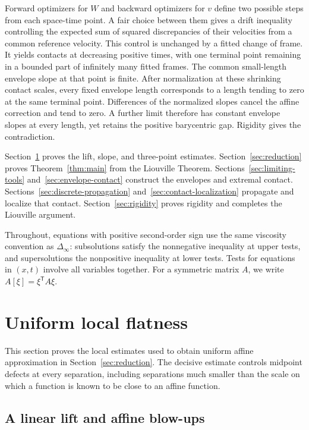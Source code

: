 \documentclass[11pt]{article}
\numberwithin{equation}{section}
\theoremstyle{definition}
\theoremstyle{remark}
\newcommand{\Dinf}{\Delta_{\infty}}
\begin{document}
Forward optimizers for $W$ and backward optimizers for $v$ define two
possible steps from each space-time point. A fair choice between them
gives a drift inequality controlling the expected sum of squared discrepancies
of their velocities from a common reference velocity. This control is
unchanged by a fitted change of frame. It yields contacts at decreasing
positive times, with one terminal point remaining in a bounded part of
infinitely many fitted frames. The common small-length envelope slope at
that point is finite. After normalization at these shrinking contact
scales, every fixed envelope length corresponds to a length tending to zero
at the same terminal point. Differences of the normalized slopes cancel
the affine correction and tend to zero. A further limit therefore has
constant envelope slopes at every length, yet retains the positive
barycentric gap.
Rigidity gives the contradiction.

Section~\ref{sec:flatness} proves the lift, slope, and three-point estimates.
Section~\ref{sec:reduction} proves Theorem~\ref{thm:main} from the
Liouville Theorem. Sections~\ref{sec:limiting-tools}
and~\ref{sec:envelope-contact} construct the envelopes and extremal contact.
Sections~\ref{sec:discrete-propagation}
and~\ref{sec:contact-localization} propagate and localize that contact.
Section~\ref{sec:rigidity} proves rigidity and completes the Liouville
argument.

Throughout, equations with positive second-order sign use the same
viscosity convention as $\Dinf$: subsolutions satisfy the nonnegative
inequality at upper tests, and supersolutions the nonpositive inequality
at lower tests. Tests for equations in $(x,t)$ involve all variables
together. For a symmetric matrix $A$, we write $A[\xi]=\xi^{\mathsf T}A\xi$.

\section{Uniform local flatness}\label{sec:flatness}

This section proves the local estimates used to obtain uniform affine approximation in Section~\ref{sec:reduction}. The decisive estimate controls midpoint defects at every separation, including separations much smaller than the scale on which a function is known to be close to an affine function.

\subsection{A linear lift and affine blow-ups}
\end{document}
